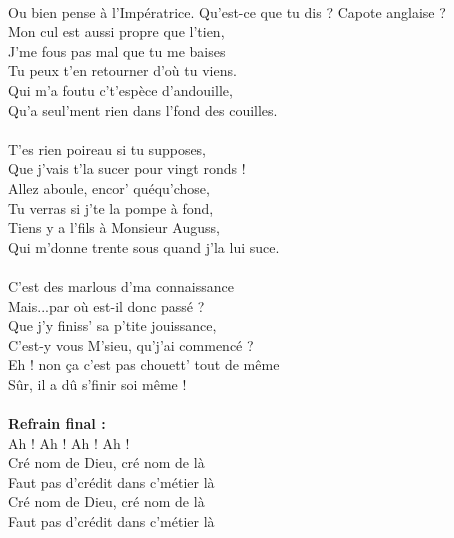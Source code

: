 \\Ou bien pense à l'Impératrice.
\breakpage
Qu'est-ce que tu dis ? Capote anglaise ?
\\Mon cul est aussi propre que l'tien,
\\J'me fous pas mal que tu me baises
\\Tu peux t'en retourner d'où tu viens.
\\Qui m'a foutu c't'espèce d'andouille,
\\Qu'a seul'ment rien dans l'fond des couilles.
\\\\T'es rien poireau si tu supposes,
\\Que j'vais t'la sucer pour vingt ronds !
\\Allez aboule, encor' quéqu'chose,
\\Tu verras si j'te la pompe à fond,
\\Tiens y a l'fils à Monsieur Auguss,
\\Qui m'donne trente sous quand j'la lui suce.
\\\\C'est des marlous d'ma connaissance
\\Mais...par où est-il donc passé ?
\\Que j'y finiss' sa p'tite jouissance,
\\C'est-y vous M'sieu, qu'j'ai commencé ?
\\Eh ! non ça c'est pas chouett' tout de même
\\Sûr, il a dû s'finir soi même !
\\\\\textbf{Refrain final :}
\\Ah ! Ah ! Ah ! Ah !
\\Cré nom de Dieu, cré nom de là
\\Faut pas d'crédit dans c'métier là
\\Cré nom de Dieu, cré nom de là
\\Faut pas d'crédit dans c'métier là
\\

\breakpage